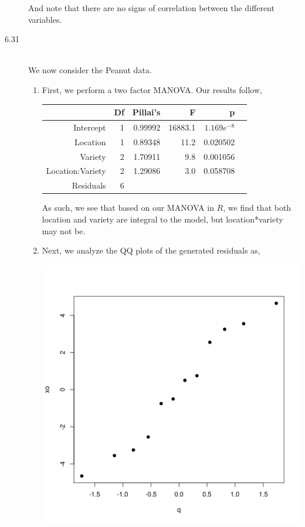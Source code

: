 \documentclass[letterpaper,10pt]{article}
\begin{document}
\begin{description}
\begin{center}
\end{center}
And note that there are no signs of correlation between the different variables.
\item[6.31]\hfill\\
We now consider the Peanut data.
\begin{enumerate}[label=\alph*.]
\item First, we perform a two factor MANOVA. Our results follow,
\begin{center}
\begin{tabular}{|r|r|r|r|r|r|}
\hline
& Df & Pillai's & F & p\\\hline
Intercept & 1 & 0.99992 & 16883.1 & $1.169e^{-8}$\\
Location & 1 & 0.89348 & 11.2 & 0.020502\\
Variety & 2 & 1.70911 & 9.8 & 0.001056\\
Location:Variety & 2 & 1.29086 & 3.0 & 0.058708\\
Residuals & 6 &&&\\\hline
\end{tabular}
\end{center}
As such, we see that based on our MANOVA in $R$, we find that both location and variety are integral to the model, but location*variety may not be.
\item Next, we analyze the QQ plots of the generated residuals as,
\begin{center}
\includegraphics[scale=.5]{631r1.png}

\end{center}
\end{enumerate}
\end{description}
\end{document}
